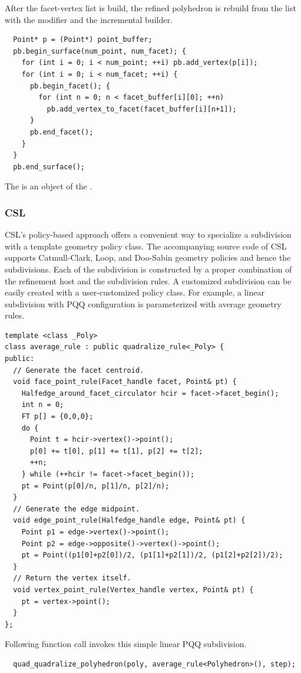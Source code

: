 After the facet-vertex list is build, 
the refined polyhedron is rebuild from the list with the 
modifier and the incremental builder.
\begin{lstlisting}
  Point* p = (Point*) point_buffer;
  pb.begin_surface(num_point, num_facet); {
    for (int i = 0; i < num_point; ++i) pb.add_vertex(p[i]);    
    for (int i = 0; i < num_facet; ++i) {
      pb.begin_facet(); {
        for (int n = 0; n < facet_buffer[i][0]; ++n)
          pb.add_vertex_to_facet(facet_buffer[i][n+1]);
      }
      pb.end_facet();
    }
  }
  pb.end_surface();
\end{lstlisting}
The  is an object of the 
.

\subsubsection*{CSL}
CSL's policy-based approach offers a convenient way to specialize a
subdivision with a template geometry policy class.  The accompanying
source code of CSL supports Catmull-Clark, Loop, and Doo-Sabin
geometry policies and hence the subdivisions.  Each of the subdivision
is constructed by a proper combination of the refinement host and the
subdivision rules.  A customized subdivision can be easily created with a
user-customized policy class. For example, a linear subdivision with
PQQ configuration is parameterized with average geometry rules.
\begin{lstlisting}
template <class _Poly>
class average_rule : public quadralize_rule<_Poly> {
public:
  // Generate the facet centroid.
  void face_point_rule(Facet_handle facet, Point& pt) {
    Halfedge_around_facet_circulator hcir = facet->facet_begin();
    int n = 0;
    FT p[] = {0,0,0};
    do {
      Point t = hcir->vertex()->point();
      p[0] += t[0], p[1] += t[1], p[2] += t[2]; 
      ++n;
    } while (++hcir != facet->facet_begin());
    pt = Point(p[0]/n, p[1]/n, p[2]/n);
  }
  // Generate the edge midpoint.
  void edge_point_rule(Halfedge_handle edge, Point& pt) {
    Point p1 = edge->vertex()->point();
    Point p2 = edge->opposite()->vertex()->point();
    pt = Point((p1[0]+p2[0])/2, (p1[1]+p2[1])/2, (p1[2]+p2[2])/2);
  }
  // Return the vertex itself.
  void vertex_point_rule(Vertex_handle vertex, Point& pt) {
    pt = vertex->point();
  }
};
\end{lstlisting}
Following function call invokes this simple linear PQQ subdivision.
\begin{lstlisting}
  quad_quadralize_polyhedron(poly, average_rule<Polyhedron>(), step);
\end{lstlisting}


